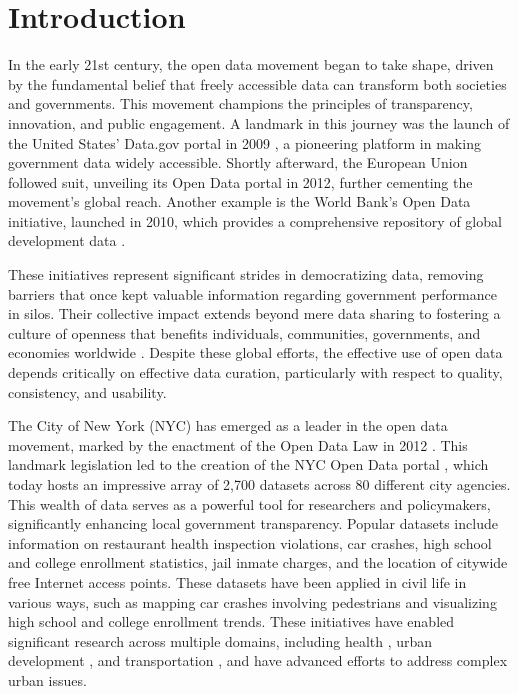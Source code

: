 \documentclass[linenumber]{jdsart}
\begin{document}
\section{Introduction} 
\label{sec:intro}

In the early 21st century, the open data movement began 
to take shape, driven by the fundamental belief that 
freely accessible data can transform both societies and 
governments. This movement champions the principles
of transparency, innovation, and public engagement. 
A landmark in this journey was the launch of the United States'
Data.gov portal in 2009 \citep{dataGov}, a pioneering
platform in making government data widely accessible. Shortly afterward,
the European Union followed suit, unveiling its Open Data portal 
\citep{dataEU} in 2012, further cementing the movement's 
global reach. Another example is the World Bank's Open 
Data initiative, launched in 2010, which provides a comprehensive 
repository of global development data \citep{dataWorldBank}.

 
These initiatives represent significant strides in democratizing data, 
removing barriers that once kept valuable information 
regarding government performance in silos. Their collective impact 
extends beyond mere data sharing to fostering a culture of openness 
that benefits individuals, communities, governments, and economies worldwide 
\citep{barns2016mine, wang2016adoption}.
Despite these global efforts, the effective use of open data depends
critically on effective data curation, particularly with respect to
quality, consistency, and usability.


The City of New York (NYC) has emerged as a leader in the open data movement,
marked by the enactment of the Open Data Law in 2012
\citep{zuiderwijk2014open}. This landmark legislation led to the
creation of the NYC Open Data portal \citep{dataNYC}, which 
today hosts an impressive array of 2,700 datasets
across 80 different city agencies. This wealth of data serves as a
powerful tool for researchers and policymakers, significantly
enhancing local government transparency.
Popular datasets include information on
restaurant health inspection violations, car crashes, high school and
college enrollment statistics, jail inmate charges, and the location
of citywide free Internet access points. These datasets have been
applied in civil life in various ways, such as mapping car crashes
involving pedestrians and visualizing high school and college
enrollment trends. These initiatives have enabled significant research across multiple
domains, including health \citep{cantor2018facets, shankar2021data},
urban development \citep{neves2020impacts}, and transportation
\citep{gerte2019understanding}, and have advanced efforts to address
complex urban issues.
\end{document}

